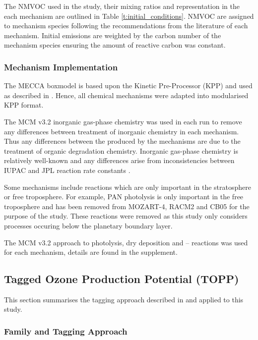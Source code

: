 The NMVOC used in the study, their mixing ratios and representation in the each mechanism are outlined in Table \ref{t:initial_conditions}.
NMVOC are assigned to mechanism species following the recommendations from the literature of each mechanism.
Initial emissions are weighted by the carbon number of the mechanism species ensuring the amount of reactive carbon was constant.

\subsubsection{Mechanism Implementation} %

The MECCA boxmodel \citep{Sander:2005} is based upon the Kinetic Pre-Processor (KPP) \citep{Damian:2002} and used as described in \citet{Butler:2011}. 
Hence, all chemical mechanisms were adapted into modularised KPP format.

The MCM v3.2 inorganic gas-phase chemistry was used in each run to remove any differences between treatment of inorganic chemistry in each mechanism.
Thus any differences between the  produced by the mechanisms are due to the treatment of organic degradation chemistry.
Inorganic gas-phase chemistry is relatively well-known and any differences arise from inconsistencies between IUPAC and JPL reaction rate constants \citep{Emmerson:2009}.

Some mechanisms include reactions which are only important in the stratosphere or free troposphere.
For example, PAN photolysis is only important in the free troposphere \citep{Harwood:2003} and has been removed from MOZART-4, RACM2 and CB05 for the purpose of the study. 
These reactions were removed as this study only considers processes occuring below the planetary boundary layer.

The MCM v3.2 approach to photolysis, dry deposition and -- reactions was used for each mechanism, details are found in the supplement.

\subsection{Tagged Ozone Production Potential (TOPP)}
This section summarises the tagging approach described in \citet{Butler:2011} and applied to this study.

\subsubsection[Ox Family and Tagging Approach]{ Family and Tagging Approach} \label{ss:tagging} %

